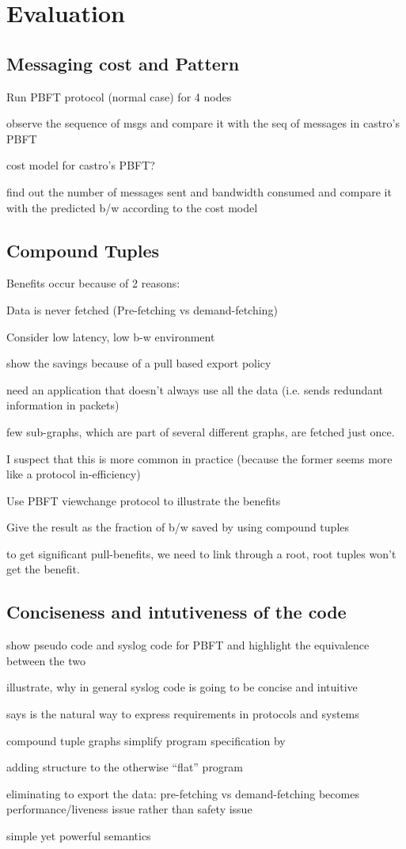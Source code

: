 \section{Evaluation}

\subsection{Messaging cost and Pattern}
\bi
\item Run PBFT protocol (normal case) for 4 nodes
\item observe the sequence of msgs and compare it with the seq of messages in castro's PBFT
\item cost model for castro's PBFT?
\item find out the number of messages sent and bandwidth consumed and compare it with the predicted b/w according to the cost model
\ei

\subsection{Compound Tuples}
Benefits occur because of 2 reasons:

Data is never fetched (Pre-fetching vs demand-fetching)
\bi
\item Consider low latency, low b-w environment
\item show the savings because of a pull based export policy
\item need an application that doesn't always use all the data (i.e. sends redundant information in packets) 
\ei

few sub-graphs, which are part of several different graphs, are fetched just once.
\bi
\item I suspect that this is more common in practice (because the former seems more like a protocol in-efficiency)
\item Use PBFT viewchange protocol to illustrate the benefits
\item Give the result as the fraction of b/w saved by using compound tuples
\item to get significant pull-benefits, we need to link through a root, root tuples won't get the benefit. 
\ei


\subsection{Conciseness and intutiveness of the code}
\bi
\item show pseudo code and syslog code for PBFT and highlight the equivalence between the two
\item illustrate, why in general syslog code is going to be concise and intuitive
\bi
\item says is the natural way to express requirements in protocols and systems
\item compound tuple graphs simplify program specification by
\item adding structure to the otherwise ``flat'' program
\item eliminating to export the data: pre-fetching vs demand-fetching becomes performance/liveness issue rather than safety issue
\item simple yet powerful semantics
\ei
\ei


